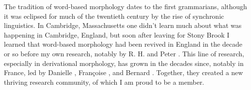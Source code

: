 \documentclass[output=paper]{langsci/langscibook}
\begin{document}
The tradition of word-based morphology dates to the first grammarians,
although it was eclipsed for much of the twentieth century by the rise
of synchronic linguistics. In Cambridge, Massachusetts one didn't learn
much about what was happening in Cambridge, England, but soon after
leaving for Stony Brook I learned that word-based morphology had been
revived in England in the decade or so before my own research, notably
by R. H. %
\citet{Robins59} %
%
and Peter %
\citet{Matthews65,Matthews72}%
%
. This line of
research, especially in derivational morphology, has grown in the
decades since, notably in France, led by Danielle %
\citet{Corbin87}%
%
,
Françoise %
\citet{kerleroux96}%
%
, and Bernard %
\citet{Fradin03}%
%
. Together, they
created a new thriving research community, of which I am proud to be a
member.


















{\sloppy
    \printbibliography[heading=subbibliography,notkeyword=this]
}
\end{document}
